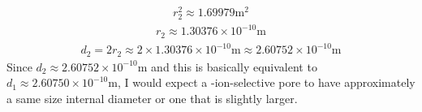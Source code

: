 \documentclass[11pt]{article}
\begin{document}
\begin{enumerate}[label=\arabic*.]
\begin{align*}
\end{align*}
\begin{align*}
r_2^2 \approx 1.69979 \text{m}^2
\end{align*}
\begin{align*}
r_2 \approx 1.30376 \times 10^{-10} \text{m}
\end{align*}
\begin{align*}
d_2 = 2r_2 \approx 2 \times 1.30376 \times 10^{-10} \text{m} \approx 2.60752 \times 10^{-10} \text{m}
\end{align*}
Since $d_2 \approx 2.60752 \times 10^{-10} \text{m}$ and this is basically equivalent to $d_1 \approx 2.60750 \times 10^{-10} \text{m}$, I would expect a -ion-selective
pore to have approximately a same size internal diameter or one that is slightly larger.




\end{enumerate}
\end{document}

